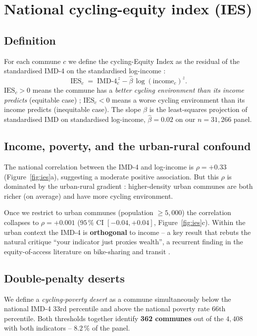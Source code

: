 \documentclass[11pt,a4paper]{article}
\newcommand{\IMD}{\mathrm{IMD}}
\newcommand{\IES}{\mathrm{IES}}
\begin{document}
\section{National cycling-equity index (IES)}
\label{sec:ies}

\subsection{Definition}

For each commune $c$ we define the cycling-Equity Index as
the residual of the standardised IMD-4 on the standardised
log-income :
\[
    \IES_c \;=\; \IMD\text{-}4_c^{\,z}
                  - \widehat{\beta}\, \log(\text{income}_c)^{z}.
\]
$\IES_c > 0$ means the commune has a \emph{better cycling
environment than its income predicts} (equitable case) ;
$\IES_c < 0$ means a worse cycling environment than its income
predicts (inequitable case).  The slope $\widehat{\beta}$ is the
least-squares projection of standardised IMD on standardised
log-income, $\widehat{\beta} = 0.02$ on our $n = 31{,}266$ panel.

\subsection{Income, poverty, and the urban-rural confound}

The national correlation between the IMD-4 and log-income is
$\rho = +0.33$ (Figure~\ref{fig:ies}a), suggesting a moderate
positive association.  But this $\rho$ is dominated by the
urban-rural gradient : higher-density urban communes are both
richer (on average) and have more cycling environment.

Once we restrict to urban communes (population $\geq 5{,}000$)
the correlation collapses to $\rho = +0.001$ ($95\,\%$ CI
$[-0.04, +0.04]$, Figure~\ref{fig:ies}c).  Within the urban
context the IMD-4 is \textbf{orthogonal} to income -- a key
result that rebuts the natural critique ``your indicator just
proxies wealth'', a recurrent finding in the equity-of-access
literature on bike-sharing and transit
\citep{Smith2015,Hosford2018,ElGeneidy2016}.

\subsection{Double-penalty deserts}

We define a \emph{cycling-poverty desert} as a commune
simultaneously below the national IMD-4 33rd percentile and
above the national poverty rate 66th percentile.  Both thresholds
together identify \textbf{362 communes} out of the $4{,}408$ with
both indicators -- $8.2\,\%$ of the panel.
\end{document}
